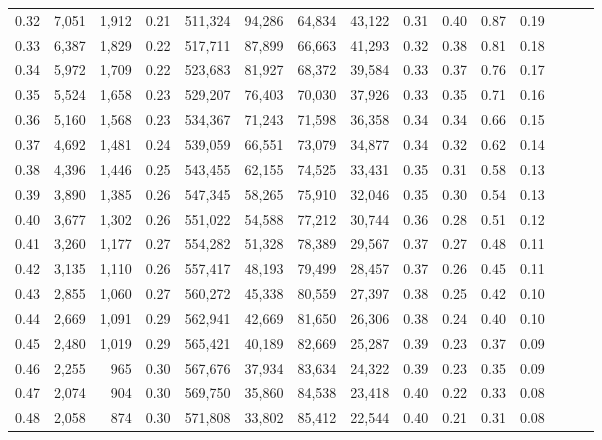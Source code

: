 \begin{tabular}{rrrrrrrrrrrrrrr}
0.32 &   7,051 &  1,912 &  0.21 &  511,324 &   94,286 &   64,834 &   43,122 &  0.31 &  0.40 &  0.87 &      0.19 \\
0.33 &   6,387 &  1,829 &  0.22 &  517,711 &   87,899 &   66,663 &   41,293 &  0.32 &  0.38 &  0.81 &      0.18 \\
0.34 &   5,972 &  1,709 &  0.22 &  523,683 &   81,927 &   68,372 &   39,584 &  0.33 &  0.37 &  0.76 &      0.17 \\
0.35 &   5,524 &  1,658 &  0.23 &  529,207 &   76,403 &   70,030 &   37,926 &  0.33 &  0.35 &  0.71 &      0.16 \\
0.36 &   5,160 &  1,568 &  0.23 &  534,367 &   71,243 &   71,598 &   36,358 &  0.34 &  0.34 &  0.66 &      0.15 \\
0.37 &   4,692 &  1,481 &  0.24 &  539,059 &   66,551 &   73,079 &   34,877 &  0.34 &  0.32 &  0.62 &      0.14 \\
0.38 &   4,396 &  1,446 &  0.25 &  543,455 &   62,155 &   74,525 &   33,431 &  0.35 &  0.31 &  0.58 &      0.13 \\
0.39 &   3,890 &  1,385 &  0.26 &  547,345 &   58,265 &   75,910 &   32,046 &  0.35 &  0.30 &  0.54 &      0.13 \\
0.40 &   3,677 &  1,302 &  0.26 &  551,022 &   54,588 &   77,212 &   30,744 &  0.36 &  0.28 &  0.51 &      0.12 \\
0.41 &   3,260 &  1,177 &  0.27 &  554,282 &   51,328 &   78,389 &   29,567 &  0.37 &  0.27 &  0.48 &      0.11 \\
0.42 &   3,135 &  1,110 &  0.26 &  557,417 &   48,193 &   79,499 &   28,457 &  0.37 &  0.26 &  0.45 &      0.11 \\
0.43 &   2,855 &  1,060 &  0.27 &  560,272 &   45,338 &   80,559 &   27,397 &  0.38 &  0.25 &  0.42 &      0.10 \\
0.44 &   2,669 &  1,091 &  0.29 &  562,941 &   42,669 &   81,650 &   26,306 &  0.38 &  0.24 &  0.40 &      0.10 \\
0.45 &   2,480 &  1,019 &  0.29 &  565,421 &   40,189 &   82,669 &   25,287 &  0.39 &  0.23 &  0.37 &      0.09 \\
0.46 &   2,255 &    965 &  0.30 &  567,676 &   37,934 &   83,634 &   24,322 &  0.39 &  0.23 &  0.35 &      0.09 \\
0.47 &   2,074 &    904 &  0.30 &  569,750 &   35,860 &   84,538 &   23,418 &  0.40 &  0.22 &  0.33 &      0.08 \\
0.48 &   2,058 &    874 &  0.30 &  571,808 &   33,802 &   85,412 &   22,544 &  0.40 &  0.21 &  0.31 &      0.08 \\

\end{tabular}
